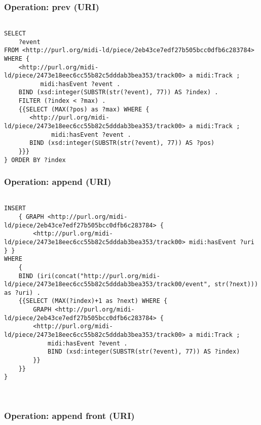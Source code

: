 \subsubsection{Operation: prev (URI)}
\label{query:URI:prev}

\begin{lstlisting}[language=sparql]

SELECT
	?event
FROM <http://purl.org/midi-ld/piece/2eb43ce7edf27b505bcc0dfb6c283784>
WHERE {
    <http://purl.org/midi-ld/piece/2473e18eec6cc55b82c5dddab3bea353/track00> a midi:Track ;
          midi:hasEvent ?event .
    BIND (xsd:integer(SUBSTR(str(?event), 77)) AS ?index) .
    FILTER (?index < ?max) .
    {{SELECT (MAX(?pos) as ?max) WHERE {
 	   <http://purl.org/midi-ld/piece/2473e18eec6cc55b82c5dddab3bea353/track00> a midi:Track ;
 	         midi:hasEvent ?event .
 	   BIND (xsd:integer(SUBSTR(str(?event), 77)) AS ?pos)
 	}}}
} ORDER BY ?index

\end{lstlisting}

\subsubsection{Operation: append (URI)}
\label{query:URI:append}

\begin{lstlisting}[language=sparql]

INSERT
	{ GRAPH <http://purl.org/midi-ld/piece/2eb43ce7edf27b505bcc0dfb6c283784> { 
		<http://purl.org/midi-ld/piece/2473e18eec6cc55b82c5dddab3bea353/track00> midi:hasEvent ?uri } }
WHERE 
	{  
	BIND (iri(concat("http://purl.org/midi-ld/piece/2473e18eec6cc55b82c5dddab3bea353/track00/event", str(?next))) as ?uri) .
	{{SELECT (MAX(?index)+1 as ?next) WHERE {
		GRAPH <http://purl.org/midi-ld/piece/2eb43ce7edf27b505bcc0dfb6c283784> {
		<http://purl.org/midi-ld/piece/2473e18eec6cc55b82c5dddab3bea353/track00> a midi:Track ;
			midi:hasEvent ?event .
			BIND (xsd:integer(SUBSTR(str(?event), 77)) AS ?index)
		}} 
	}}			
}



\end{lstlisting}

\subsubsection{Operation: append front (URI)}
\label{query:URI:append_front}

